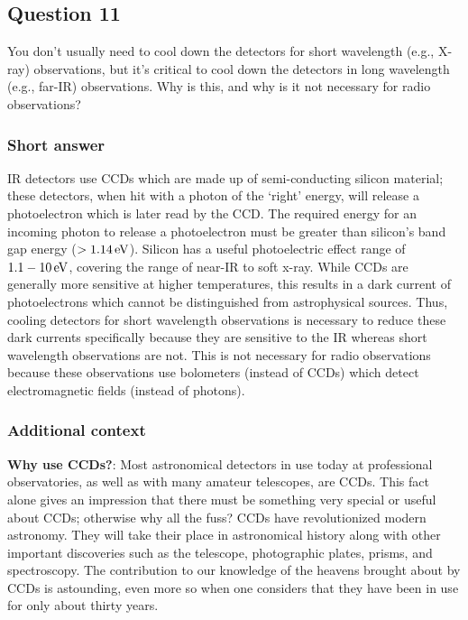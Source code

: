 \documentclass[a4paper,10pt]{article}
\begin{document}

\newpage
\subsection{Question 11}

You don't usually need to cool down the detectors for short wavelength (e.g., X-ray) observations, but it's critical to cool down the detectors in long wavelength (e.g., far-IR) observations. Why is this, and why is it not necessary for radio observations?

\subsubsection{Short answer}

IR detectors use CCDs which are made up of semi-conducting silicon material; these detectors, when hit with a photon of the `right' energy, will release a photoelectron which is later read by the CCD. The required energy for an incoming photon to release a photoelectron must be greater than silicon's band gap energy ($>1.14\,{\rm eV}$). Silicon has a useful photoelectric effect range of $1.1-10\,{\rm eV}$, covering the range of near-IR to soft x-ray. While CCDs are generally more sensitive at higher temperatures, this results in a dark current of photoelectrons which cannot be distinguished from astrophysical sources. Thus, cooling detectors for short wavelength observations is necessary to reduce these dark currents specifically because they are sensitive to the IR whereas short wavelength observations are not. This is not necessary for radio observations because these observations use bolometers (instead of CCDs) which detect electromagnetic fields (instead of photons).

\subsubsection{Additional context}

{\noindent}\textbf{Why use CCDs?}: Most astronomical detectors in use today at professional observatories, as well as with many amateur telescopes, are CCDs. This fact alone gives an impression that there must be something very special or useful about CCDs; otherwise why all the fuss? CCDs have revolutionized modern astronomy. They will take their place in astronomical history along with other important discoveries such as the telescope, photographic plates, prisms, and spectroscopy. The contribution to our knowledge of the heavens brought about by CCDs is astounding, even more so when one considers that they have been in use for only about thirty years.
\end{document}
